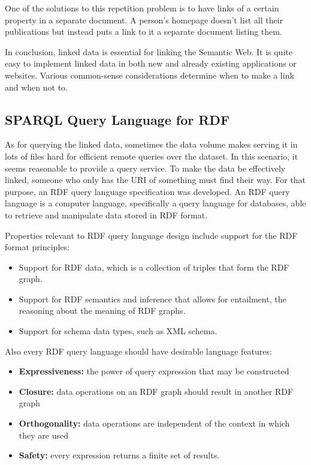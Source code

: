 \documentclass[thesis=M,english,hidelinks]{FITthesis}[2019/12/23]
\begin{document}
One of the solutions to this repetition problem is to have links of a certain property in a separate document.   A person's homepage doesn't list all their publications but instead puts a link to it a separate document listing them.

In conclusion, linked data is essential for linking the Semantic Web. It is quite easy to implement linked data in both new and already existing applications or websites. Various common-sense considerations determine when to make a link and when not to.

\subsection{SPARQL Query Language for RDF}

As for querying the linked data, sometimes the data volume makes serving it in lots of files hard for efficient remote queries over the dataset.  In this scenario, it seems reasonable to provide a query service.  To make the data be effectively linked, someone who only has the  \gls{URI} of something must find their way. For that purpose, an \gls{RDF} query language specification was developed. An \gls{RDF} query language is a computer language, specifically a query language for databases, able to retrieve and manipulate data stored in \gls{RDF} format.

Properties relevant to RDF query language design include support for the RDF format principles\cite{rdf_query_lang_comparison}:

\begin{itemize}
	\item Support for RDF data, which is a collection of triples that form the RDF graph.
	\item Support for RDF semantics and inference that allows for entailment, the reasoning about the meaning of RDF graphs.
	\item Support for schema data types, such as XML schema.
\end{itemize}
Also every RDF query language should have desirable language features:

\begin{itemize}
	\item \textbf{Expressiveness:} the power of query expression that may be constructed
	\item \textbf{Closure:} data operations on an RDF graph should result in another RDF graph
	\item \textbf{Orthogonality:} data operations are independent of the context in which they are used
	\item \textbf{Safety:} every expression returns a finite set of results.
\end{itemize}
\end{document}
